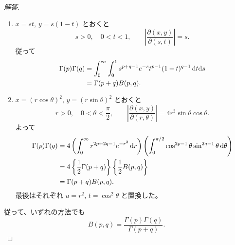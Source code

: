 \begin{proof}[解答]
\begin{enumerate}
  \item[(1)] $x=st$, $y=s(1-t)$ とおくと
  \[
  s>0,\quad 0<t<1,\qquad
  \left|\frac{\partial(x,y)}{\partial(s,t)}\right|=s.
  \]
  従って
  \begin{align*}
  \Gamma(p)\Gamma(q)
  &=\int_0^\infty\int_0^1
  s^{p+q-1}e^{-s}t^{p-1}(1-t)^{q-1}\,\mathrm{d} t\mathrm{d} s\\
  &=\Gamma(p+q)B(p,q).
  \end{align*}

  \item[(2)] $x=(r\cos\theta)^2$, $y=(r\sin\theta)^2$ とおくと
  \[
  r>0,\quad0<\theta<\frac{\pi}{2},\qquad
  \left|\frac{\partial(x,y)}{\partial(r,\theta)}\right|
  =4r^3\sin\theta\cos\theta.
  \]
  よって
  \begin{align*}
  \Gamma(p)\Gamma(q)
  &=4\left(\int_0^\infty r^{2p+2q-1}e^{-r^2}\,\mathrm{d} r\right)
  \left(\int_0^{\pi/2}\cos^{2p-1}\theta\sin^{2q-1}\theta\,\mathrm{d}\theta\right)\\
  &=4\left\{\frac12\Gamma(p+q)\right\}
       \left\{\frac12B(p,q)\right\}\\
  &=\Gamma(p+q)B(p,q).
  \end{align*}
  最後はそれぞれ $u=r^2$, $t=\cos^2\theta$ と置換した。
\end{enumerate}
従って、いずれの方法でも
\[
B(p,q)=\frac{\Gamma(p)\Gamma(q)}{\Gamma(p+q)}.
\]
\end{proof}

